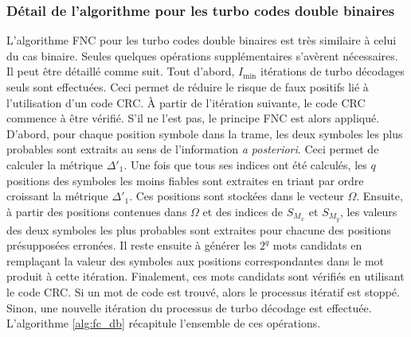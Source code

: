 \subsubsection{Détail de l'algorithme pour les turbo codes double binaires}
L'algorithme FNC pour les turbo codes double binaires est très similaire à celui du cas binaire. Seules quelques 
opérations supplémentaires s'avèrent nécessaires. Il peut être détaillé comme suit. Tout d'abord, $I_{\text{min}}$ itérations de 
turbo décodages seuls sont effectuées. Ceci permet de réduire le risque de faux positifs lié à l'utilisation 
d'un code CRC. À partir de l'itération suivante, le code CRC commence à être vérifié. S'il ne l'est pas, le principe FNC
est alors appliqué. D'abord, pour chaque position symbole dans la trame, les deux symboles les plus probables sont 
extraits au sens de l'information \textit{a posteriori}. Ceci permet de calculer la métrique $\Delta'_1$. Une fois que 
tous ses indices ont été calculés, les $q$ positions des symboles les moins fiables sont extraites en triant par ordre 
croissant la métrique $\Delta'_1$. Ces positions sont stockées dans le vecteur $\Omega$. Ensuite, à partir des positions contenues dans
$\Omega$ et des indices de $S_{M_x}$ et $S_{M_y}$, les valeurs des deux symboles les plus probables sont extraites pour 
chacune des positions présupposées erronées. Il reste ensuite à générer les $2^q$ mots candidats en remplaçant la valeur des symboles
aux positions correspondantes dans le mot produit à cette itération. Finalement, ces mots candidats sont vérifiés
en utilisant le code CRC. Si un mot de code est trouvé, alors le processus itératif est stoppé. Sinon, une nouvelle itération
du processus de turbo décodage est effectuée. L'algorithme \ref{alg:fc_db} récapitule l'ensemble de ces opérations.

